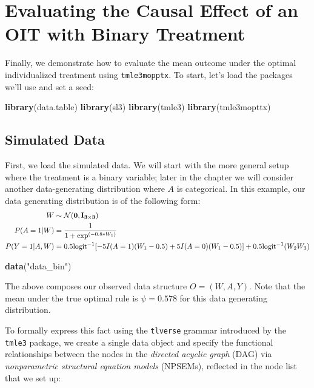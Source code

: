 \documentclass[12pt, krantz2,]{book}
\newenvironment{Shaded}{\begin{snugshade}}{\end{snugshade}}
\newcommand{\KeywordTok}[1]{\textcolor[rgb]{0.13,0.29,0.53}{\textbf{#1}}}
\newcommand{\NormalTok}[1]{#1}
\newcommand{\StringTok}[1]{\textcolor[rgb]{0.31,0.60,0.02}{#1}}
\theoremstyle{definition}
\theoremstyle{definition}
\theoremstyle{definition}
\newcommand{\1}{\mathbbm{1}}
\begin{document}
\hypertarget{oit-eval-bin}{%
\section{Evaluating the Causal Effect of an OIT with Binary Treatment}\label{oit-eval-bin}}

Finally, we demonstrate how to evaluate the mean outcome under the optimal
individualized treatment using \texttt{tmle3mopptx}. To start, let's load the packages
we'll use and set a seed:

\begin{Shaded}
\begin{Highlighting}[]
\KeywordTok{library}\NormalTok{(data.table)}
\KeywordTok{library}\NormalTok{(sl3)}
\KeywordTok{library}\NormalTok{(tmle3)}
\KeywordTok{library}\NormalTok{(tmle3mopttx)}
\end{Highlighting}
\end{Shaded}

\hypertarget{simulated-data}{%
\subsection{Simulated Data}\label{simulated-data}}

First, we load the simulated data. We will start with the more general setup
where the treatment is a binary variable; later in the chapter we will consider
another data-generating distribution where \(A\) is categorical. In this example,
our data generating distribution is of the following form:
\begin{align*}
  W &\sim \mathcal{N}(\bf{0},I_{3 \times 3})\\
  P(A=1|W) &= \frac{1}{1+\exp^{(-0.8*W_1)}}\\
  P(Y=1|A,W) &= 0.5\text{logit}^{-1}[-5I(A=1)(W_1-0.5)+5I(A=0)(W_1-0.5)] +
     0.5\text{logit}^{-1}(W_2W_3)
\end{align*}

\begin{Shaded}
\begin{Highlighting}[]
\KeywordTok{data}\NormalTok{(}\StringTok{"data_bin"}\NormalTok{)}
\end{Highlighting}
\end{Shaded}

The above composes our observed data structure \(O = (W, A, Y)\). Note that the
mean under the true optimal rule is \(\psi=0.578\) for this data generating
distribution.

To formally express this fact using the \texttt{tlverse} grammar introduced by the
\texttt{tmle3} package, we create a single data object and specify the functional
relationships between the nodes in the \emph{directed acyclic graph} (DAG) via
\emph{nonparametric structural equation models} (NPSEMs), reflected in the node list
that we set up:
\end{document}
